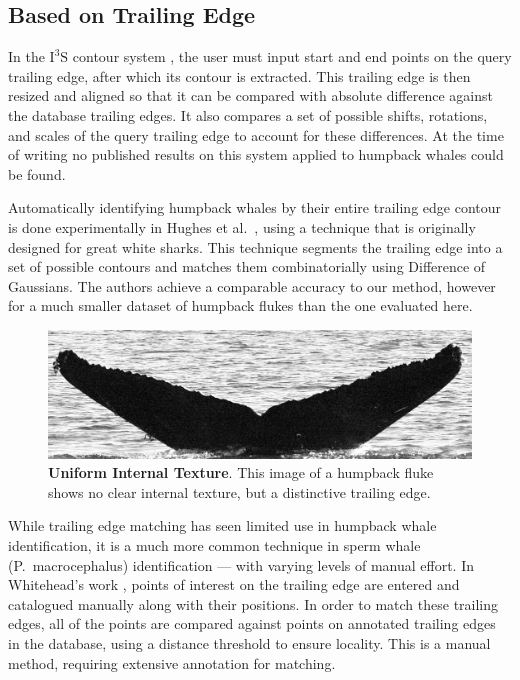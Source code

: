 \subsection{Based on Trailing Edge}

In the $\text{I}^3\text{S}$ contour system \cite{i3scontour}, the user must input start and end points on the query trailing edge, after which its contour is extracted.
This trailing edge is then resized and aligned so that it can be compared with absolute difference against the database trailing edges.
It also compares a set of possible shifts, rotations, and scales of the query trailing edge to account for these differences.
At the time of writing no published results on this system applied to humpback whales could be found.

Automatically identifying humpback whales by their entire trailing edge contour is done experimentally in Hughes et al.\ \cite{hughes2015automated}, using a technique that is originally designed for great white sharks. 
This technique segments the trailing edge into a set of possible contours and matches them combinatorially using Difference of Gaussians.
The authors achieve a comparable accuracy to our method, however for a much smaller dataset of humpback flukes than the one evaluated here.

\begin{figure}[t]%
\centering
\includegraphics[width=1.0\textwidth]{../images/unclear_texture.jpg}
\caption{\textbf{Uniform Internal Texture}. This image of a humpback fluke shows no clear internal texture, but a distinctive trailing edge.}
\label{fig:unclear_texture}
\end{figure}

While trailing edge matching has seen limited use in humpback whale identification, it is a much more common technique in sperm whale (P.\ macrocephalus) identification \cite{huele2000finding, beekmans2005comparison, whitehead1990computer} --- with varying levels of manual effort.
In Whitehead's work \cite{whitehead1990computer}, points of interest on the trailing edge are entered and catalogued manually along with their positions.
In order to match these trailing edges, all of the points are compared against points on annotated trailing edges in the database, using a distance threshold to ensure locality.
This is a manual method, requiring extensive annotation for matching.

